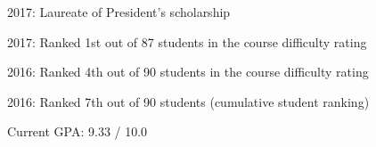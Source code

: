 

\begin{cventries}

\cventry
{} 
{}
{}
{} 
{
 \begin{cvitems}
\item{2017: Laureate of President’s scholarship}
\item {2017: Ranked 1st out of 87 students in the course difficulty rating}
\item {2016: Ranked 4th out of 90 students in the course difficulty rating}
\item {2016: Ranked 7th out of 90 students (cumulative student ranking)}
\item {Current GPA: 9.33 / 10.0}
 \end{cvitems}
}

\end{cventries}
